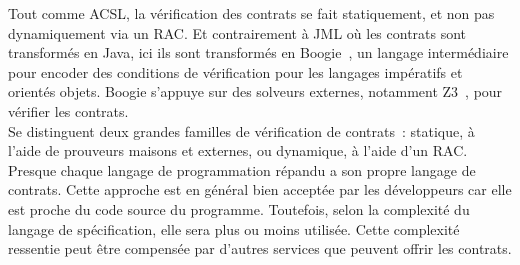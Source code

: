 Tout comme ACSL, la vérification des contrats se fait statiquement, et non pas
dynamiquement via un RAC. Et contrairement à JML où les contrats sont
transformés en Java, ici ils sont transformés en Boogie~,
un langage intermédiaire pour encoder des conditions de vérification pour les
langages impératifs et orientés objets. Boogie s'appuye sur des solveurs
externes, notamment Z3~, pour vérifier les contrats. \\

Se distinguent deux grandes familles de vérification de contrats~: statique, à
l'aide de prouveurs maisons et externes, ou dynamique, à l'aide d'un RAC. \\

Presque chaque langage de programmation répandu a son propre langage de
contrats. Cette approche est en général bien acceptée par les développeurs car
elle est proche du code source du programme. Toutefois, selon la complexité du
langage de spécification, elle sera plus ou moins utilisée. Cette complexité
ressentie peut être compensée par d'autres services que peuvent offrir les
contrats.
